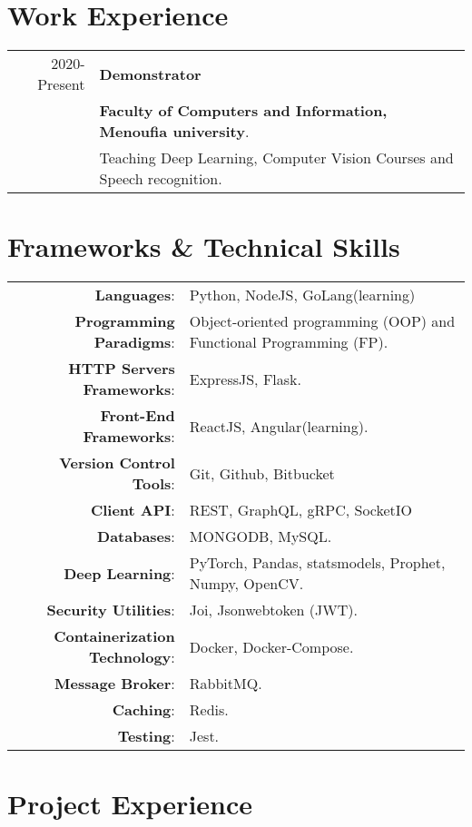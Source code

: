 \documentclass[a4paper,10pt]{article}
\begin{document}
\section{\textbf{Work Experience}}

\begin{tabular}{r|l}
2020-Present  & \textbf{Demonstrator} \\&\textbf{Faculty of Computers and Information, Menoufia university}.\\& Teaching Deep Learning, Computer Vision Courses and Speech recognition.
\\
\end{tabular}

\section{\textbf{Frameworks \& Technical Skills}}

\begin{tabular}{rl}	
    \textbf{Languages}:& Python, NodeJS, GoLang(learning)\\
    \textbf{Programming Paradigms}:&  Object-oriented programming (OOP) and Functional Programming (FP).\\
    \textbf{HTTP Servers Frameworks}:& ExpressJS, Flask.\\
    \textbf{Front-End Frameworks}:& ReactJS, Angular(learning).\\
    \textbf{Version Control Tools}:& Git, Github, Bitbucket\\
    \textbf{Client API}:& REST, GraphQL, gRPC, SocketIO\\
    \textbf{Databases}:& MONGODB, MySQL.\\
    \textbf{Deep Learning}:& PyTorch, Pandas, statsmodels, Prophet, Numpy, OpenCV.\\
    \textbf{Security Utilities}:& Joi, Jsonwebtoken (JWT).\\ 
    \textbf{Containerization Technology}:& Docker, Docker-Compose.\\
    \textbf{Message Broker}:& RabbitMQ.\\
    \textbf{Caching}:& Redis.\\
    \textbf{Testing}:& Jest.\\ 
\end{tabular}

 
\section{\textbf{Project Experience}}  
\end{document}
